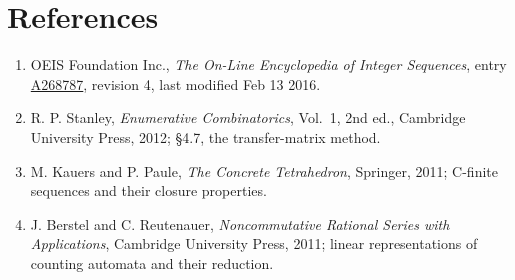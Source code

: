 \documentclass[11pt]{article}
\theoremstyle{definition}
\begin{document}
\section{References}

\begin{enumerate}

\item OEIS Foundation Inc., \emph{The On-Line Encyclopedia of Integer Sequences}, entry \href{https://oeis.org/A268787}{A268787}, revision 4, last modified Feb 13 2016.

\item R. P. Stanley, \emph{Enumerative Combinatorics}, Vol.~1, 2nd ed., Cambridge University Press, 2012; \S4.7, the transfer-matrix method.

\item M. Kauers and P. Paule, \emph{The Concrete Tetrahedron}, Springer, 2011; C-finite sequences and their closure properties.

\item J. Berstel and C. Reutenauer, \emph{Noncommutative Rational Series with Applications}, Cambridge University Press, 2011; linear representations of counting automata and their reduction.

\end{enumerate}
\end{document}
